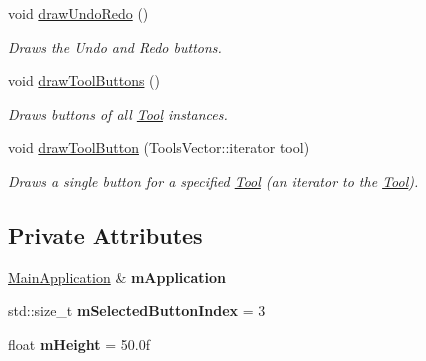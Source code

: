 \begin{DoxyCompactItemize}
\mbox{\label{classpepr3d_1_1_toolbar_afd2e255728e6b0962da017f3ee1822bc}} 
void \mbox{\hyperlink{classpepr3d_1_1_toolbar_afd2e255728e6b0962da017f3ee1822bc}{draw\+Undo\+Redo}} ()
\begin{DoxyCompactList}\small\item\em Draws the Undo and Redo buttons. \end{DoxyCompactList}\item 
\mbox{\label{classpepr3d_1_1_toolbar_a88b084de711b74735348315189c01fe7}} 
void \mbox{\hyperlink{classpepr3d_1_1_toolbar_a88b084de711b74735348315189c01fe7}{draw\+Tool\+Buttons}} ()
\begin{DoxyCompactList}\small\item\em Draws buttons of all \mbox{\hyperlink{classpepr3d_1_1_tool}{Tool}} instances. \end{DoxyCompactList}\item 
\mbox{\label{classpepr3d_1_1_toolbar_a9366ee163dfe041a2661fe5eb664a325}} 
void \mbox{\hyperlink{classpepr3d_1_1_toolbar_a9366ee163dfe041a2661fe5eb664a325}{draw\+Tool\+Button}} (Tools\+Vector\+::iterator tool)
\begin{DoxyCompactList}\small\item\em Draws a single button for a specified \mbox{\hyperlink{classpepr3d_1_1_tool}{Tool}} (an iterator to the \mbox{\hyperlink{classpepr3d_1_1_tool}{Tool}}). \end{DoxyCompactList}\end{DoxyCompactItemize}
\subsection*{Private Attributes}
\begin{DoxyCompactItemize}
\item 
\mbox{\label{classpepr3d_1_1_toolbar_a29f26071f02ab35bdaa35cd08326766a}} 
\mbox{\hyperlink{classpepr3d_1_1_main_application}{Main\+Application}} \& {\bfseries m\+Application}
\item 
\mbox{\label{classpepr3d_1_1_toolbar_af5cb57247638ff59f7dc9fef191fdcf3}} 
std\+::size\+\_\+t {\bfseries m\+Selected\+Button\+Index} = 3
\item 
\mbox{\label{classpepr3d_1_1_toolbar_aea711be10561a98a3736e87570463b02}} 
float {\bfseries m\+Height} = 50.\+0f
\end{DoxyCompactItemize}


